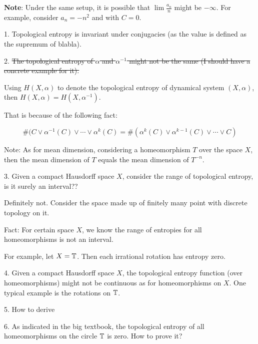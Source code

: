 \documentclass[a5paper]{article}
\begin{document}
\vspace{2mm}


{\bf Note}: Under the same setup, it is possible that $\lim \frac{a_n}{n}$ might be $- \infty$. For example, consider $a_n = - n^2$ and with $C = 0$.


\vspace{2mm}


1. Topological entropy is invariant under conjugacies (as the value is defined as the supremum of blabla).

\twomm

2. \sout{The topological entropy of $\alpha$ and $\alpha^{-1}$ might not be the same (I should have a concrete example for it).}

	Using $H(X, \alpha)$ to denote the topological entropy of dynamical system $(X, \alpha)$, then $H(X, \alpha) = H(X, \alpha^{-1})$.
    
    That is because of the following fact:
    
    $$ \#(C \vee \alpha^{-1}(C) \vee \cdots \vee \alpha^{k}(C) = \#(\alpha^{k}(C) \vee \alpha^{k - 1}(C) \vee \cdots \vee C) $$
    
    Note: As for mean dimension, considering a homeomorphism $T$ over the space $X$, then the mean dimension of $T$ equals the mean dimension of $T^{-n}$.

\twomm

3. Given a compact Hausdorff space $X$, consider the range of topological entropy, is it surely an interval??
	
    Definitely not. Consider the space made up of finitely many point with discrete topology on it.
    
	Fact: For certain space $X$, we know the range of entropies for all homeomorphisms is not an interval.
    
    For example, let $X = \mathbb{T}$. Then each irrational rotation has entropy zero.


\twomm

4. Given a compact Hausdorff space $X$, the topological entropy function (over homeomorphisms) might not be continuous as for homeomorphisms on $X$. One typical example is the rotations on $\mathbb{T}$.

\twomm

5. How to derive

\twomm


6. As indicated in the big textbook, the topological entropy of all homeomorphisms on the circle $\mathbb{T}$ is zero. How to prove it?
\end{document}
